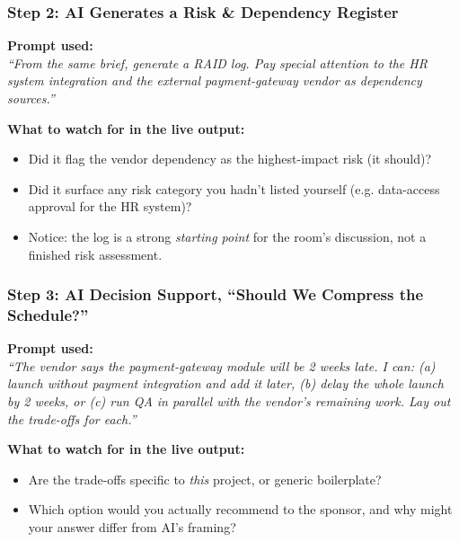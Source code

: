 \begin{frame}[fragile]\frametitle{Step 2: AI Generates a Risk \& Dependency Register}

\textbf{Prompt used:}\\
\textit{``From the same brief, generate a RAID log. Pay special attention to the HR system integration and the external payment-gateway vendor as dependency sources.''}

\vspace{0.3em}
\textbf{What to watch for in the live output:}
\begin{itemize}
  \item Did it flag the vendor dependency as the highest-impact risk (it should)?
  \item Did it surface any risk category you hadn't listed yourself (e.g. data-access approval for the HR system)?
  \item Notice: the log is a strong \textit{starting point} for the room's discussion, not a finished risk assessment.
\end{itemize}

\end{frame}

\begin{frame}[fragile]\frametitle{Step 3: AI Decision Support, ``Should We Compress the Schedule?''}

\textbf{Prompt used:}\\
\textit{``The vendor says the payment-gateway module will be 2 weeks late. I can: (a) launch without payment integration and add it later, (b) delay the whole launch by 2 weeks, or (c) run QA in parallel with the vendor's remaining work. Lay out the trade-offs for each.''}

\vspace{0.3em}
\textbf{What to watch for in the live output:}
\begin{itemize}
  \item Are the trade-offs specific to \textit{this} project, or generic boilerplate?
  \item Which option would you actually recommend to the sponsor, and why might your answer differ from AI's framing?
\end{itemize}

\end{frame}


